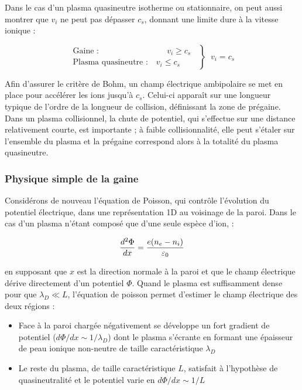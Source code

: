 \begin{refsection}
Dans le cas d'un plasma quasineutre isotherme ou stationnaire, on peut aussi
montrer que $v_i$ ne peut pas dépasser $c_s$, donnant une limite
dure à la vitesse ionique :

\begin{equation}
\left.\begin{aligned}
\text{Gaine :~~~~~~~~~~~~~~~~~~~~~~~~~}v_i\ge c_s\\
\text{Plasma quasineutre :~~~}v_i\le c_s
\end{aligned}
\;\;\right\}\;\;v_i=c_s
\end{equation}


Afin d'assurer le critère de Bohm, un champ électrique ambipolaire
se met en place pour accélérer les ions jusqu'à $c_s$. Celui-ci apparaît sur une
longueur typique de l'ordre de la longueur de collision,
définissant la zone de prégaine.
Dans un plasma collisionnel, la chute de potentiel, qui s'effectue sur une
distance relativement courte, est importante ; à faible collisionnalité, elle
peut s'étaler sur l'ensemble du plasma et la prégaine correspond alors à
la totalité du plasma quasineutre.


\subsubsection{Physique simple de la gaine}
\label{1-gaine}
Considérons de nouveau l'équation de Poisson, qui contrôle l'évolution du
potentiel électrique, dans une représentation 1D au voisinage de la paroi. Dans
le cas d'un plasma n'étant composé que d'une seule espèce d'ion,  :

\begin{equation}
\frac{d^{{2}}\Phi}{dx}=\frac{e(n_{e}-n_{i})}{\varepsilon{_{0}}}
\end{equation}

 en supposant que $x$ est la
 direction normale à la paroi et que le champ électrique dérive directement
 d'un potentiel $\Phi$.
 Quand le plasma est suffisamment dense pour que $\lambda_D\ll L$, l'équation de poisson permet
 d'estimer le champ électrique des deux régions :

 \begin{itemize}
   \item Face à la paroi chargée négativement se
   développe un fort gradient de potentiel ($d\Phi/dx\sim 1/\lambda_D$) dont le plasma
   s'écrante en formant une épaisseur de peau ionique non-neutre de
   taille caractéristique $\lambda_D$
   \item Le reste du plasma, de taille caractéristique $L$, satisfait
   à l'hypothèse de quasineutralité et le potentiel varie en
   $d\Phi/dx\sim1/L$
 \end{itemize}


\end{refsection}
